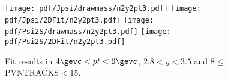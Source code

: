 \begin{figure}[H]
\begin{center}
\texttt{[image: pdf/Jpsi/drawmass/n2y2pt3.pdf]}
\texttt{[image: pdf/Jpsi/2DFit/n2y2pt3.pdf]}
\vspace*{-0.5cm}
\texttt{[image: pdf/Psi2S/drawmass/n2y2pt3.pdf]}
\texttt{[image: pdf/Psi2S/2DFit/n2y2pt3.pdf]}
\vspace*{-0.5cm}
\end{center}
\caption{Fit results in $4\gevc<pt<6\gevc$, $2.8<y<3.5$ and 8$\leq$PVNTRACKS$<$15.}
\label{Fitn2y2pt3}
\end{figure}
